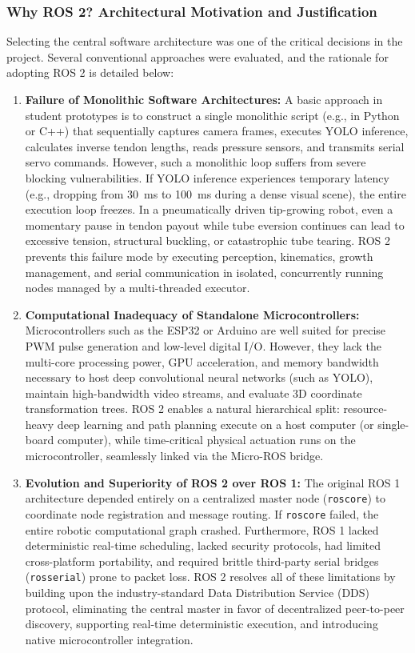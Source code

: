 \subsubsection{Why ROS 2? Architectural Motivation and Justification}
Selecting the central software architecture was one of the critical decisions in the project. Several conventional approaches were evaluated, and the rationale for adopting ROS 2 is detailed below:

\begin{enumerate}
    \item \textbf{Failure of Monolithic Software Architectures:} A basic approach in student prototypes is to construct a single monolithic script (e.g., in Python or C++) that sequentially captures camera frames, executes YOLO inference, calculates inverse tendon lengths, reads pressure sensors, and transmits serial servo commands. However, such a monolithic loop suffers from severe blocking vulnerabilities. If YOLO inference experiences temporary latency (e.g., dropping from 30~ms to 100~ms during a dense visual scene), the entire execution loop freezes. In a pneumatically driven tip-growing robot, even a momentary pause in tendon payout while tube eversion continues can lead to excessive tension, structural buckling, or catastrophic tube tearing. ROS 2 prevents this failure mode by executing perception, kinematics, growth management, and serial communication in isolated, concurrently running nodes managed by a multi-threaded executor.
    
    \item \textbf{Computational Inadequacy of Standalone Microcontrollers:} Microcontrollers such as the ESP32 or Arduino are well suited for precise PWM pulse generation and low-level digital I/O. However, they lack the multi-core processing power, GPU acceleration, and memory bandwidth necessary to host deep convolutional neural networks (such as YOLO), maintain high-bandwidth video streams, and evaluate 3D coordinate transformation trees. ROS 2 enables a natural hierarchical split: resource-heavy deep learning and path planning execute on a host computer (or single-board computer), while time-critical physical actuation runs on the microcontroller, seamlessly linked via the Micro-ROS bridge.
    
    \item \textbf{Evolution and Superiority of ROS 2 over ROS 1:} The original ROS 1 architecture depended entirely on a centralized master node (\texttt{roscore}) to coordinate node registration and message routing. If \texttt{roscore} failed, the entire robotic computational graph crashed. Furthermore, ROS 1 lacked deterministic real-time scheduling, lacked security protocols, had limited cross-platform portability, and required brittle third-party serial bridges (\texttt{rosserial}) prone to packet loss. ROS 2 resolves all of these limitations by building upon the industry-standard Data Distribution Service (DDS) protocol, eliminating the central master in favor of decentralized peer-to-peer discovery, supporting real-time deterministic execution, and introducing native microcontroller integration.
\end{enumerate}

